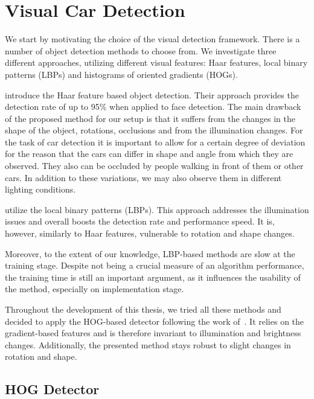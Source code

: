 
\section{Visual Car Detection} %
\label{sec:perception}

We start by motivating the choice of the visual detection framework. There is
a number of object detection methods to choose from. We investigate three
different approaches, utilizing different visual features: Haar features,
local binary patterns (LBPs) and histograms of oriented gradients (HOGs).

\citet{violajones2001} introduce the Haar feature based object detection.
Their approach provides the detection rate of up to 95\% when applied to face
detection. The main drawback of the proposed method for our setup is that it
suffers from the changes in the shape of the object, rotations, occlusions and
from the illumination changes. For the task of car detection it is important
to allow for a certain degree of deviation for the reason that the cars can
differ in shape and angle from which they are observed. They also can be
occluded by people walking in front of them or other cars. In addition to
these variations, we may also observe them in different lighting conditions.

\citet{lbp2010} utilize the local binary patterns (LBPs). This approach
addresses the illumination issues and overall boosts the detection rate and
performance speed. It is, however, similarly to Haar features, vulnerable to
rotation and shape changes.

Moreover, to the extent of our knowledge, LBP-based methods are slow at the
training stage. Despite not being a crucial measure of an algorithm
performance, the training time is still an important argument, as it
influences the usability of the method, especially on implementation stage.

Throughout the development of this thesis, we tried all these methods and
decided to apply the HOG-based detector following the work
of~\citet{dalal2005}. It relies on the gradient-based features and is
therefore invariant to illumination and brightness changes. Additionally, the
presented method stays robust to slight changes in rotation and shape.

\subsection{HOG Detector}\label{sub:hog_detector}


